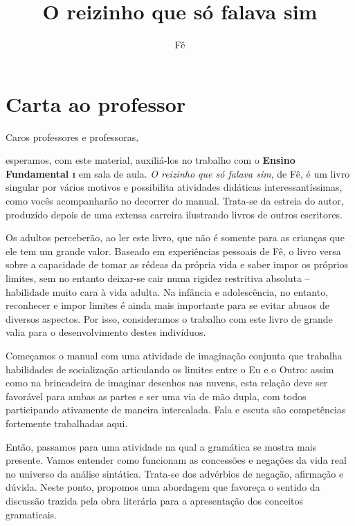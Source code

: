 \documentclass[11pt]{extarticle}
\newcommand{\AutorLivro}{Fê}
\newcommand{\TituloLivro}{O reizinho que só falava sim}
\newcommand{\colaborador}{Renier Silva}
\begin{document}
\title{\TituloLivro}
\author{\AutorLivro}
\def\authornotes{\colaborador}

\date{}
\maketitle

\tableofcontents

\section{Carta ao professor}

Caros professores e professoras,

esperamos, com este material,
auxiliá-los no trabalho com o \textbf{Ensino Fundamental \textsc{i}} em 
sala de aula. \textit{O reizinho que só falava sim}, de Fê, é um livro singular
por vários motivos e possibilita atividades didáticas interessantíssimas,
como vocês acompanharão no decorrer do manual. Trata-se da estreia do autor, produzido depois de uma extensa carreira ilustrando livros de outros escritores.

Os adultos perceberão, ao ler este livro, que não é somente para as crianças que ele 
tem um grande valor. Baseado em experiências pessoais de Fê, o livro versa sobre a capacidade de tomar as rédeas da própria vida e saber
impor os próprios limites, sem no entanto deixar-se cair numa rigidez restritiva absoluta -- habilidade muito cara à vida adulta. Na infância e adolescência, no entanto,
reconhecer e impor limites é ainda mais importante para se evitar abusos de diversos
aspectos. Por isso, consideramos o trabalho com este livro de grande valia 
para o desenvolvimento destes indivíduos. 

Começamos o manual com uma atividade de imaginação conjunta que trabalha
habilidades de socialização articulando os limites entre o Eu e o Outro:
assim como na brincadeira de imaginar desenhos nas nuvens, esta relação
deve ser favorável para ambas as partes e ser uma via de mão dupla,
com todos participando ativamente de maneira intercalada.
Fala e escuta são competências fortemente trabalhadas aqui. 

Então, passamos para uma atividade na qual a gramática se mostra mais presente. 
Vamos entender como funcionam as concessões e negações da vida real 
no universo da análise sintática. Trata-se dos advérbios de negação, afirmação e dúvida. 
Neste ponto, propomos uma abordagem que favoreça o sentido da discussão trazida
pela obra literária para a apresentação dos conceitos gramaticais.
\end{document}
